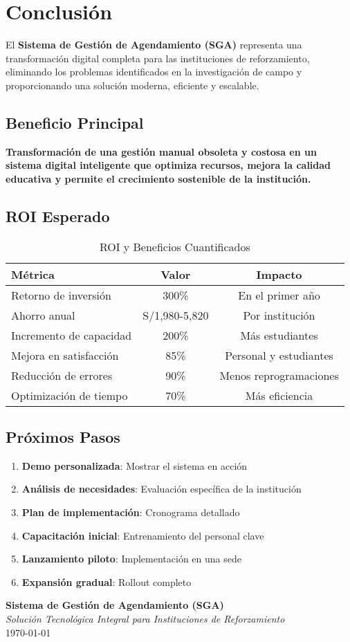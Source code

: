 \documentclass[12pt,a4paper]{article}
\begin{document}
\section{Conclusión}

El \textbf{Sistema de Gestión de Agendamiento (SGA)} representa una transformación digital completa para las instituciones de reforzamiento, eliminando los problemas identificados en la investigación de campo y proporcionando una solución moderna, eficiente y escalable.

\subsection{Beneficio Principal}
\textbf{Transformación de una gestión manual obsoleta y costosa en un sistema digital inteligente que optimiza recursos, mejora la calidad educativa y permite el crecimiento sostenible de la institución.}

\subsection{ROI Esperado}

\begin{table}[H]
\centering
\begin{tabular}{|l|c|c|}
\hline
\textbf{Métrica} & \textbf{Valor} & \textbf{Impacto} \\
\hline
Retorno de inversión & 300\% & En el primer año \\
Ahorro anual & S/1,980-5,820 & Por institución \\
Incremento de capacidad & 200\% & Más estudiantes \\
Mejora en satisfacción & 85\% & Personal y estudiantes \\
Reducción de errores & 90\% & Menos reprogramaciones \\
Optimización de tiempo & 70\% & Más eficiencia \\
\hline
\end{tabular}
\caption{ROI y Beneficios Cuantificados}
\end{table}

\subsection{Próximos Pasos}

\begin{enumerate}
    \item \textbf{Demo personalizada}: Mostrar el sistema en acción
    \item \textbf{Análisis de necesidades}: Evaluación específica de la institución
    \item \textbf{Plan de implementación}: Cronograma detallado
    \item \textbf{Capacitación inicial}: Entrenamiento del personal clave
    \item \textbf{Lanzamiento piloto}: Implementación en una sede
    \item \textbf{Expansión gradual}: Rollout completo
\end{enumerate}

\vspace{2cm}

\begin{center}
\textbf{Sistema de Gestión de Agendamiento (SGA)} \\
\textit{Solución Tecnológica Integral para Instituciones de Reforzamiento} \\
\today
\end{center}
\end{document}
